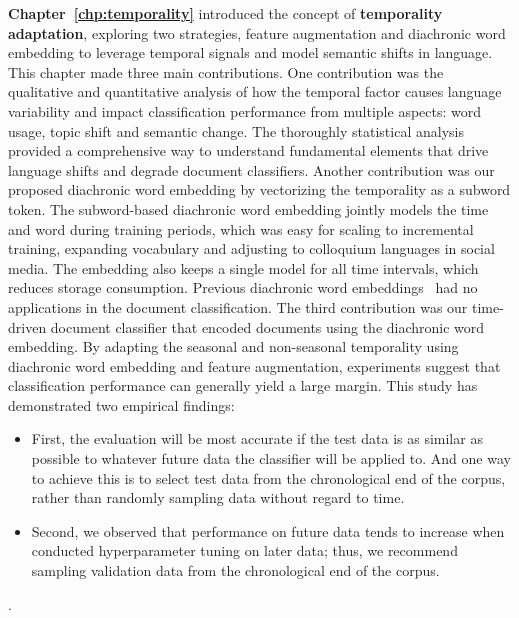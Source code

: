 \textbf{Chapter~\ref{chp:temporality}} introduced the concept of \textbf{temporality adaptation}, exploring two strategies, feature augmentation and diachronic word embedding to leverage temporal signals and model semantic shifts in language. 
This chapter made three main contributions.
One contribution was the qualitative and quantitative analysis of how the temporal factor causes language variability and impact classification performance from multiple aspects: word usage, topic shift and semantic change.
The thoroughly statistical analysis provided a comprehensive way to understand fundamental elements that drive language shifts and degrade document classifiers.
Another contribution was our proposed diachronic word embedding by vectorizing the temporality as a subword token.
The subword-based diachronic word embedding jointly models the time and word during training periods, which was easy for scaling to incremental training, expanding vocabulary and adjusting to colloquium languages in social media. 
The embedding also keeps a single model for all time intervals, which reduces storage consumption.
Previous diachronic word embeddings~\cite{kutuzov2018diachronic} had no applications in the document classification. 
The third contribution was our time-driven document classifier that encoded documents using the diachronic word embedding.
By adapting the seasonal and non-seasonal temporality using diachronic word embedding and feature augmentation, 
experiments suggest that classification performance can generally yield a large margin.
This study has demonstrated two empirical findings:
\begin{itemize}
    \item First, the evaluation will be most accurate if the test data is as similar as possible to whatever future data the classifier will be applied to. And one way to achieve this is to select test data from the chronological end of the corpus, rather than randomly sampling data without regard to time.
    \item Second, we observed that performance on future data tends to increase when conducted hyperparameter tuning on later data; thus, we recommend sampling validation data from the chronological end of the corpus.
\end{itemize}.

